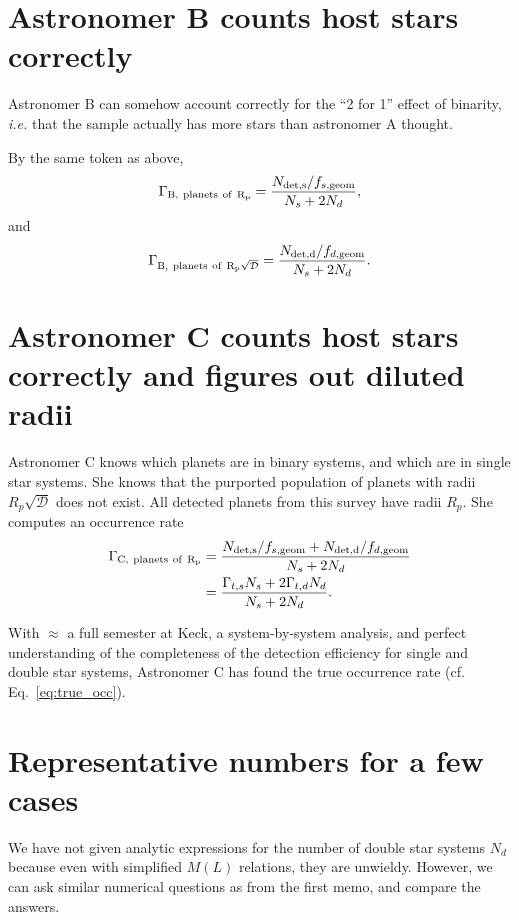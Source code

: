 \documentclass{emulateapj}
\begin{document}
\section{Astronomer B counts host stars correctly}
Astronomer B can somehow account correctly for the ``2 for 1'' 
effect of binarity, \textit{i.e.} that the sample actually has more stars than 
astronomer A thought.

By the same token as above,
\begin{equation}
\Gamma_{\rm B,\ planets\ of\ R_p} = \frac{N_{\rm det,s}/f_{s,{\rm geom}}}{N_s + 
2N_d},
\end{equation}
and
\begin{equation}
\Gamma_{\rm B,\ planets\ of\ R_p \sqrt{\mathcal{D}}} = \frac{N_{\rm 
det,d}/f_{d,{\rm geom}}}{N_s 
	+ 2N_d}.
\end{equation}


\section{Astronomer C counts host stars correctly and figures out diluted radii}
Astronomer C knows which planets are in binary systems, and which are in 
single star systems.
She knows that the purported population of planets with radii $R_p 
\sqrt{\mathcal{D}}$ does not exist. All detected planets from this survey have 
radii $R_p$. She computes an occurrence rate
\begin{align}
\Gamma_{\rm C,\ planets\ of\ R_p} &= 
\frac{N_{\rm det,s}/f_{s,{\rm geom}} + N_{\rm det,d}/f_{d,{\rm geom}}}{N_s + 
2N_d} \\
&= \frac{\Gamma_{t,s} N_s + 2\Gamma_{t,d} N_d}{N_s + 2 N_d}.
\end{align}

With $\approx$ a full semester at Keck, a system-by-system analysis, 
and perfect understanding of the completeness of the detection efficiency for 
single and double star systems, Astronomer C has found the true occurrence rate 
(cf. Eq.~\ref{eq:true_occ}).


\section{Representative numbers for a few cases}

We have not given analytic expressions for the number of double star systems 
$N_d$ because even with simplified $M(L)$ relations, they are unwieldy.
However, we can ask similar numerical questions as from the first memo, and 
compare the answers.
\end{document}
